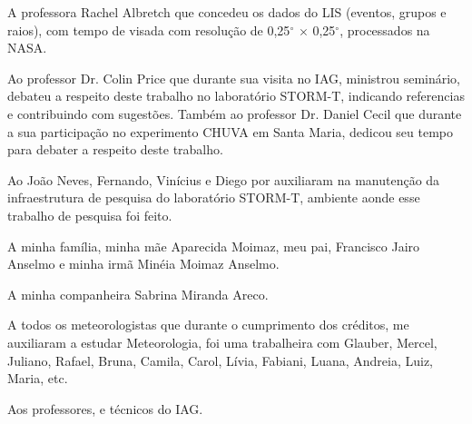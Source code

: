 \documentclass[12pt,a4paper,tocpage=plain,floatnumber=continuous,chapter=TITLE,appendix=nobox,font=plain, header=ruled,hyperindex=false]{abnt}
\begin{document}
A professora Rachel Albretch que concedeu os dados do LIS (eventos, grupos e raios), com tempo de visada com resolução de 0,25$^{\circ}$ $\times$ 0,25$^{\circ}$, processados na NASA.

Ao professor Dr. Colin Price que durante sua visita no IAG, ministrou seminário, debateu a respeito deste trabalho no laboratório STORM-T, indicando referencias e contribuindo com sugestões. Também ao professor Dr. Daniel Cecil que durante a sua participação no experimento CHUVA em Santa Maria, dedicou seu tempo para debater a respeito deste trabalho.   

Ao João Neves, Fernando, Vinícius e Diego por auxiliaram na manutenção da infraestrutura de pesquisa do laboratório STORM-T, ambiente aonde esse trabalho de pesquisa foi feito.

A minha família, minha mãe Aparecida Moimaz, meu pai, Francisco Jairo Anselmo e minha irmã Minéia Moimaz Anselmo. 

A minha companheira Sabrina Miranda Areco.

A todos os meteorologistas que durante o cumprimento dos créditos, me auxiliaram a estudar Meteorologia, foi uma trabalheira com  Glauber, Mercel, Juliano, Rafael, Bruna, Camila, Carol, Lívia, Fabiani, Luana, Andreia, Luiz, Maria, etc.

Aos professores, e técnicos do IAG.
\end{document}
